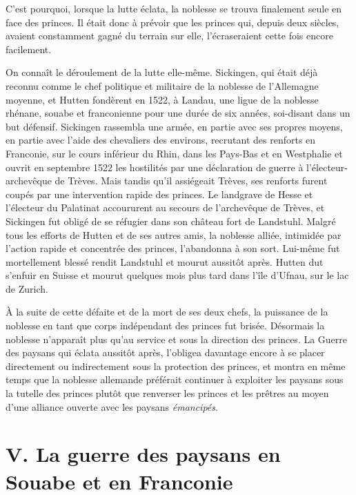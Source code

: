 \documentclass[french,twoside]{book} %
\newcommand\chapteropen{} %
\newcommand\chapterclose{} %
\begin{document}
C’est pourquoi, lorsque la lutte éclata, la noblesse se trouva finalement seule en face des princes. Il était donc à prévoir que les princes qui, depuis deux siècles, avaient constamment gagné du terrain sur elle, l’écraseraient cette fois encore facilement.\par
On connaît le déroulement de la lutte elle-même. Sickingen, qui était déjà reconnu comme le chef politique et militaire de la noblesse de l’Allemagne moyenne, et Hutten fondèrent en 1522, à Landau, une ligue de la noblesse rhénane, souabe et franconienne pour une durée de six années, soi-disant dans un but défensif. Sickingen rassembla une armée, en partie avec ses propres moyens, en partie avec l’aide des chevaliers des environs, recrutant des renforts en Franconie, sur le cours inférieur du Rhin, dans les Pays-Bas et en Westphalie et ouvrit en septembre 1522 les hostilités par une déclaration de guerre à l’électeur-archevêque de Trèves. Mais tandis qu’il assiégeait Trèves, ses renforts furent coupés par une intervention rapide des princes. Le landgrave de Hesse et l’électeur du Palatinat accoururent au secours de l’archevêque de Trèves, et Sickingen fut obligé de se réfugier dans son château fort de Landstuhl. Malgré tous les efforts de Hutten et de ses autres amis, la noblesse alliée, intimidée par l’action rapide et concentrée des princes, l’abandonna à son sort. Lui-même fut mortellement blessé rendit Landstuhl et mourut aussitôt après. Hutten dut s’enfuir en Suisse et mourut quelques mois plus tard dans l’île d’Ufnau, sur le lac de Zurich.\par
À la suite de cette défaite et de la mort de ses deux chefs, la puissance de la noblesse en tant que corps indépendant des princes fut brisée. Désormais la noblesse n’apparaît plus qu’au service et sous la direction des princes. La Guerre des paysans qui éclata aussitôt après, l’obligea davantage encore à se placer directement ou indirectement sous la protection des princes, et montra en même temps que la noblesse allemande préférait continuer à exploiter les paysans sous la tutelle des princes plutôt que renverser les princes et les prêtres au moyen d’une alliance ouverte avec les paysans \emph{émancipés}.
\chapterclose


\chapteropen
\renewcommand{\leftmark}{V. La guerre des paysans en Souabe et en Franconie}
\chapter[V. La guerre des paysans en Souabe et en Franconie]{V. La guerre des paysans en Souabe et en Franconie}
\end{document}
